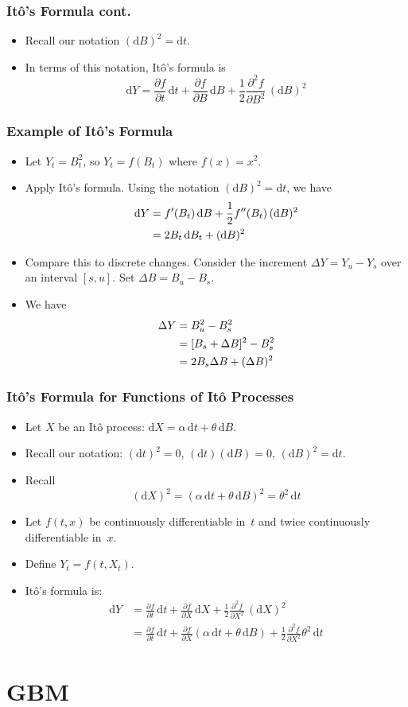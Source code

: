 \documentclass[10pt]{beamer}
\newcommand{\bi}{\begin{itemize}}
\newcommand{\ei}{\end{itemize}}
\newcommand{\im}{\item}
\newcommand{\D}{\mathrm{d}}
\newcommand{\bfr}{\begin{frame}}
\begin{document}
\bfr\frametitle{It\^o's Formula cont.}
\bi
\im  Recall our notation $(\D B)^2 = \D t$.
\im In terms of this notation, It\^o's formula is
$$
\D Y = \frac{\partial f}{\partial t}\,\D t +\frac{\partial f}{\partial B}\,\D B + \frac{1}{2}\frac{\partial^2 f}{\partial B^2}\,(\D B)^2
$$
\ei
\end{frame}


\bfr\frametitle{Example of It\^o's Formula}
\bi
\im  Let $Y_t=B_t^2$, so $Y_t = f(B_t)$ where $f(x)=x^2$.  
\im Apply It\^o's formula.  Using the notation $(\D B)^2= \D t$, we have
\begin{align*}
\D Y &= f'(B_t)\,\D B + \frac{1}{2}f''(B_t)\,(\D B)^2 \notag\\
&= 2 B_t\,\D B_t + (\D B)^2
\end{align*}
\im Compare this to discrete changes. Consider the increment $\Delta Y = Y_u-Y_s$ over an interval $[s,u]$.  Set $\Delta B = B_u-B_s$.
\im We have
\begin{align*}
\Delta Y &= B_u^2 - B_s^2\notag\\
&= [B_s + \Delta B]^2 - B_s^2\notag\\
&= 2 B_s\Delta B + (\Delta B)^2
\end{align*}
\ei
\end{frame}


\bfr\frametitle{It\^o's Formula for Functions of It\^o Processes}
\bi
\im  Let $X$ be an It\^o process: $\D X = \alpha\,\D t + \theta\,\D B$.
\im Recall our notation: $(\D t)^2=0$, $(\D t)(\D B) = 0$, $(\D B)^2 = \D t$.  
\im Recall
$$(\D X)^2 = (\alpha\,\D t + \theta\,\D B)^2 = \theta^2\,\D t$$
\im Let $f(t,x)$ be continuously differentiable in~$t$ and twice continuously differentiable in~$x$.  
\im Define $Y_t = f(t,X_t)$.
\im It\^o's formula is:
\begin{align*}
\D Y &=  \frac{\partial f}{\partial t}\,\D t +\frac{\partial f}{\partial X}\,\D X + \frac{1}{2}\frac{\partial^2 f}{\partial X^2}\,(\D X)^2\\
&=\frac{\partial f}{\partial t}\,\D t +\frac{\partial f}{\partial X}(\alpha\,\D t + \theta\,\D B) + \frac{1}{2}\frac{\partial^2 f}{\partial X^2}\theta^2\,\D t
\end{align*}
\ei
\end{frame}

\section{GBM}\subsection{}
\end{document}
